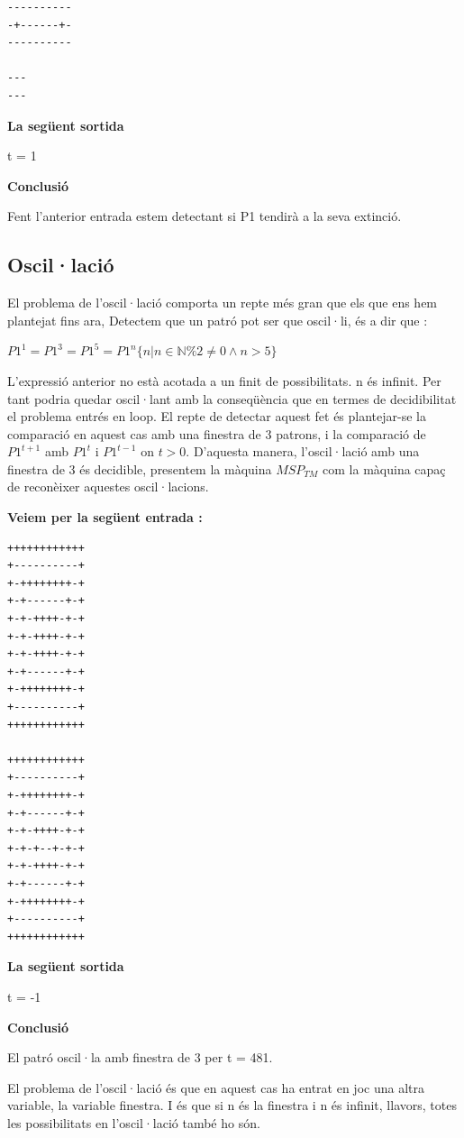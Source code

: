 \documentclass[12pt,a4paper]{report}
\def \tm{$MSP_{TM} $}
\begin{document}
\begin{lstlisting}
----------
-+------+-
----------

---
---
\end{lstlisting}

\textbf{La següent sortida}

t = 1

\textbf{Conclusió}

Fent l’anterior entrada estem detectant si P1 tendirà a la seva extinció.

\subsection{Oscil·lació}

El problema de l’oscil·lació comporta un repte més gran que els que ens hem plantejat fins ara, Detectem que un patró pot ser que oscil·li, és a dir que :

\begin{center}
$P1^1 = P1^3 = P1^5 = P1^n \{ n | n \in \mathbb{N} \% 2 \neq 0 \wedge n > 5 \} $
\end{center}

L’expressió anterior no està acotada a un finit de possibilitats. n és infinit. Per tant podria quedar oscil·lant amb la conseqüència que en termes de decidibilitat el problema entrés en loop. El repte de detectar aquest fet és plantejar-se la comparació en aquest cas amb una finestra de 3 patrons, i la comparació de $P1^{t+1}$ amb $P1^t$ i $P1^{t-1}$ on $t > 0$. D’aquesta manera, l'oscil·lació amb una finestra de 3 és decidible, presentem la màquina \tm{} com la màquina capaç de reconèixer aquestes oscil·lacions.

\textbf{Veiem per la següent entrada :}

\begin{lstlisting}
++++++++++++
+----------+
+-++++++++-+
+-+------+-+
+-+-++++-+-+
+-+-++++-+-+
+-+-++++-+-+
+-+------+-+
+-++++++++-+
+----------+
++++++++++++

++++++++++++
+----------+
+-++++++++-+
+-+------+-+
+-+-++++-+-+
+-+-+--+-+-+
+-+-++++-+-+
+-+------+-+
+-++++++++-+
+----------+
++++++++++++
\end{lstlisting}

\textbf{La següent sortida}

t = -1

\textbf{Conclusió}

El patró oscil·la amb finestra de 3 per t = 481.


El problema de l'oscil·lació és que en aquest cas ha entrat en joc una altra variable, la variable finestra. I és que si n és la finestra i n és infinit, llavors, totes les possibilitats en l'oscil·lació també ho són.
\end{document}
